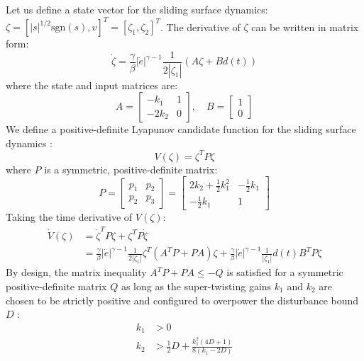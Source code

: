 Let us define a state vector for the sliding surface dynamics: $\zeta = [|s|^{1/2}\text{sgn}(s), v]^T = [\zeta_1, \zeta_2]^T$. The derivative of $\zeta$ can be written in matrix form:
\begin{equation}
\dot{\zeta} = \frac{\gamma}{\beta} |\dot{e}|^{\gamma - 1} \frac{1}{2|\zeta_1|} \left( A \zeta + B d(t) \right)
\end{equation}
where the state and input matrices are:
\begin{equation}
A = \begin{bmatrix} -k_1 & 1 \\ -2k_2 & 0 \end{bmatrix}, \quad B = \begin{bmatrix} 1 \\ 0 \end{bmatrix}
\end{equation}
We define a positive-definite Lyapunov candidate function for the sliding surface dynamics \cite{ref_76}:
\begin{equation}
V(\zeta) = \zeta^T P \zeta
\end{equation}
where $P$ is a symmetric, positive-definite matrix:
\begin{equation}
P = \begin{bmatrix} p_1 & p_2 \\ p_2 & p_3 \end{bmatrix} = \begin{bmatrix} 2k_2 + \frac{1}{2} k_1^2 & -\frac{1}{2} k_1 \\ -\frac{1}{2} k_1 & 1 \end{bmatrix}
\end{equation}
Taking the time derivative of $V(\zeta)$:
\begin{align}
\dot{V}(\zeta) &= \dot{\zeta}^T P \zeta + \zeta^T P \dot{\zeta} \\
&= \frac{\gamma}{\beta} |\dot{e}|^{\gamma - 1} \frac{1}{2|\zeta_1|} \zeta^T \left( A^T P + P A \right) \zeta + \frac{\gamma}{\beta} |\dot{e}|^{\gamma - 1} \frac{1}{|\zeta_1|} d(t) B^T P \zeta
\end{align}
By design, the matrix inequality $A^T P + P A \leq -Q$ is satisfied for a symmetric positive-definite matrix $Q$ as long as the super-twisting gains $k_1$ and $k_2$ are chosen to be strictly positive and configured to overpower the disturbance bound $D$ \cite{ref_76}:
\begin{align}
k_1 &> 0 \\
k_2 &> \frac{1}{2} D + \frac{k_1^2 (4D + 1)}{8(k_1 - 2D)}
\end{align}
